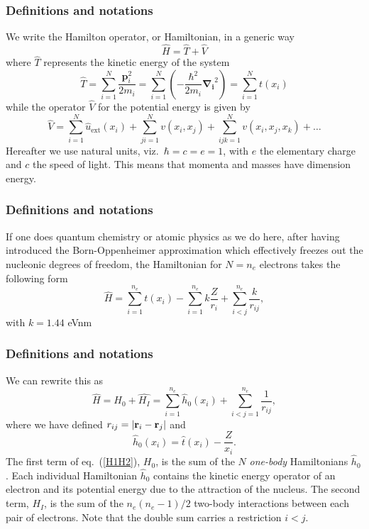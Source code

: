 \frame
{
  \frametitle{Definitions and notations}
\begin{small}
{\scriptsize
We write the Hamilton operator, or Hamiltonian,  in a generic way 
\[
	\hat{H} = \hat{T} + \hat{V} 
\]
where $\hat{T}$  represents the kinetic energy of the system
\[
	\hat{T} = \sum_{i=1}^N \frac{\mathbf{p}_i^2}{2m_i} = \sum_{i=1}^N \left( -\frac{\hbar^2}{2m_i} \mathbf{\nabla_i}^2 \right) =
		\sum_{i=1}^N t(x_i)
\]
while the operator $\hat{V}$ for the potential energy is given by
\begin{equation}
	\hat{V} = \sum_{i=1}^N \hat{u}_{\mathrm{ext}}(x_i) + \sum_{ji=1}^N v(x_i,x_j)+\sum_{ijk=1}^Nv(x_i,x_j,x_k)+\dots
\label{eq:firstv}
\end{equation}
Hereafter we use natural units, viz.~$\hbar=c=e=1$, with $e$ the elementary charge and $c$ the speed of light. This means that momenta and masses
have dimension energy. 
}
\end{small}
}
\frame
{
  \frametitle{Definitions and notations}
\begin{small}
{\scriptsize
If one does quantum chemistry or atomic physics as we do here, after having introduced the  Born-Oppenheimer approximation which effectively freezes out the nucleonic degrees
of freedom, the Hamiltonian for $N=n_e$ electrons takes the following form 
\[
  \hat{H} = \sum_{i=1}^{n_e} t(x_i) 
  - \sum_{i=1}^{n_e} k\frac{Z}{r_i} + \sum_{i<j}^{n_e} \frac{k}{r_{ij}},
\]
with $k=1.44$ eVnm
}
\end{small}
}

\frame
{
  \frametitle{Definitions and notations}
\begin{small}
{\scriptsize
 We can rewrite this as
\begin{equation}
    \hat{H} = \hat{H_0} + \hat{H_I} 
    = \sum_{i=1}^{n_e}\hat{h}_0(x_i) + \sum_{i<j=1}^{n_e}\frac{1}{r_{ij}},
\label{H1H2}
\end{equation}
where  we have defined $r_{ij}=| {\bf r}_i-{\bf r}_j|$ and
\begin{equation}
  \hat{h}_0(x_i) =  \hat{t}(x_i) - \frac{Z}{x_i}.
\label{hi}
\end{equation}
The first term of eq.~(\ref{H1H2}), $H_0$, is the sum of the $N$
\emph{one-body} Hamiltonians $\hat{h}_0$. Each individual
Hamiltonian $\hat{h}_0$ contains the kinetic energy operator of an
electron and its potential energy due to the attraction of the
nucleus. The second term, $H_I$, is the sum of the $n_e(n_e-1)/2$
two-body interactions between each pair of electrons. Note that the double sum carries a restriction $i<j$.
}
\end{small}
}

